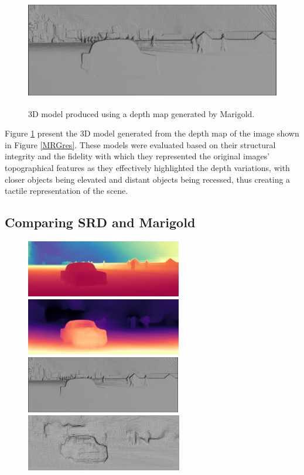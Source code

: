 \documentclass[12pt, letterpaper]{article}
\begin{document}
\begin{spacing}{1.15}
\begin{figure}[t]
    \begin{center}
        \includegraphics[height = 5cm]{test_image_pred_colored3d}
        \caption{3D model produced using a depth map generated by Marigold.}
        \label{MRG3D}
    \end{center}
\end{figure}

Figure \ref{MRG3D} present the 3D model generated from the depth map of the image shown in Figure \ref{MRGres}. These models were evaluated based on their structural
integrity and the fidelity with which they represented the original images' topographical features as they effectively highlighted the depth variations, with closer objects
being elevated and distant objects being recessed, thus creating a tactile representation of the scene.

\subsection{Comparing SRD and Marigold}

\begin{figure}[!ht]
    \begin{center}
        \includegraphics[height = 2.5cm]{test_image_pred_colored}
        \includegraphics[height = 2.5cm]{test_image_disp}\\
        \includegraphics[height = 2.49cm]{test_image_pred_colored3d}
        \includegraphics[height = 2.49cm]{3dtest}



\end{center}
\end{figure}
\end{spacing}
\end{document}
